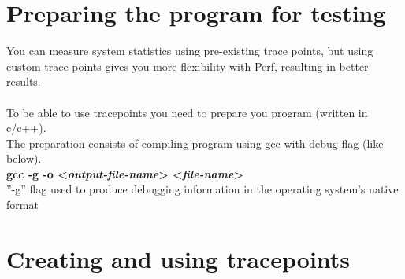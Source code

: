 \documentclass[11pt,onecolumn]{article}
\begin{document}
\newpage
\section{Preparing the program for testing}

You can measure system statistics using pre-existing trace points, but using custom trace points gives you more flexibility with Perf, resulting in better results.\\\\
To be able to use tracepoints you need to prepare you program (written in c/c++).\\
The preparation consists of compiling program using gcc with debug flag (like below).\\
\quad\textbf{gcc -g -o <\textit{output-file-name}> <\textit{file-name}>}\\
”-g” flag used to produce debugging information in the operating system’s native format

\section{Creating and using tracepoints}
\end{document}
